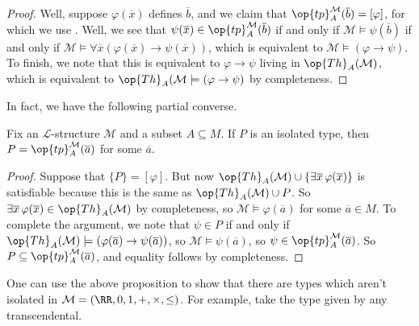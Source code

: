 \documentclass[../notes.tex]{subfiles}
\begin{document}
\begin{proof}
	Well, suppose $\varphi(\overline x)$ defines $\overline b$, and we claim that $\op{tp}_A^{\mathcal M}(\overline b)=[\varphi]$, for which we use . Well, we see that $\psi(\overline x)\in\op{tp}_A^{\mathcal M}(\overline b)$ if and only if $\mathcal M\models\psi(\overline b)$ if and only if $\mathcal M\models\forall\overline x(\varphi(\overline x)\to\psi(\overline x))$, which is equivalent to $\mathcal M\models(\varphi\to\psi)$. To finish, we note that this is equivalent to $\varphi\to\psi$ living in $\op{Th}_A(\mathcal M)$, which is equivalent to $\op{Th}_A(\mathcal M\models(\varphi\to\psi)$ by completeness.
\end{proof}
In fact, we have the following partial converse.
\begin{proposition} \label{prop:isolated-is-realized}
	Fix an $\mathcal L$-structure $\mathcal M$ and a subset $A\subseteq M$. If $P$ is an isolated type, then $P=\op{tp}_A^{\mathcal M}(\overline a)$ for some $\overline a$.
\end{proposition}
\begin{proof}
	Suppose that $\{P\}=[\varphi]$. But now $\op{Th}_A(\mathcal M)\cup\{\exists\overline x\,\varphi(\overline x)\}$ is satisfiable because this is the same as $\op{Th}_A(\mathcal M)\cup P$. So $\exists\overline x\,\varphi(\overline x)\in\op{Th}_A(\mathcal M)$ by completeness, so $\mathcal M\models\varphi(\overline a)$ for some $\overline a\in M$. To complete the argument, we note that $\psi\in P$ if and only if $\op{Th}_A(\mathcal M)\models(\varphi(\overline a)\to\psi(\overline a))$, so $\mathcal M\models\psi(\overline a)$, so $\psi\in\op{tp}_A^{\mathcal M}(\overline a)$. So $P\subseteq\op{tp}_A^{\mathcal M}(\overline a)$, and equality follows by completeness.
\end{proof}
\begin{example}
	One can use the above proposition to show that there are types which aren't isolated in $\mathcal M=(\RR,0,1,+,\times,\le)$. For example, take the type given by any transcendental.
\end{example}
\end{document}
